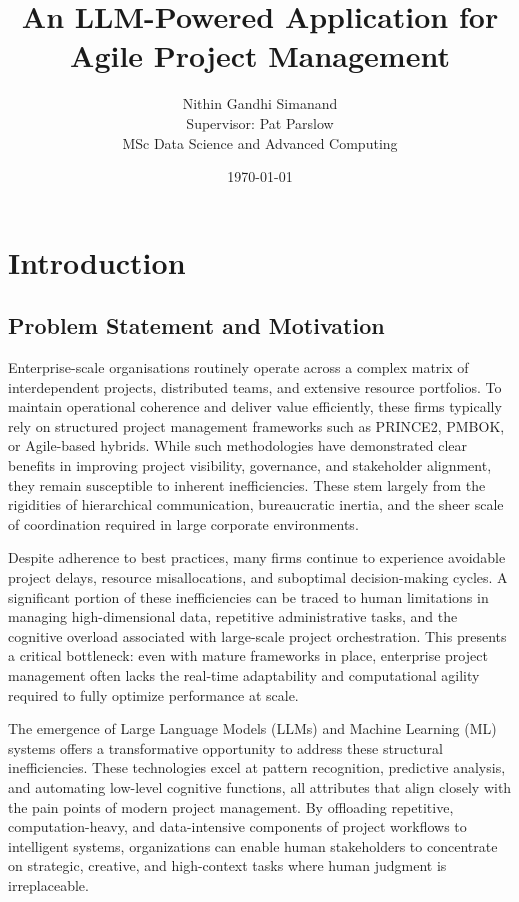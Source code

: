 \documentclass[12pt,a4paper]{report}
\title{\textbf{An LLM-Powered Application for Agile Project Management}}
\author{Nithin Gandhi Simanand \\ Supervisor: Pat Parslow \\ MSc Data Science and Advanced Computing}
\date{\today}
\begin{document}
\maketitle

\tableofcontents
\newpage

\chapter{Introduction}  %
\section{Problem Statement and Motivation}
Enterprise-scale organisations routinely operate across a complex matrix of interdependent projects, distributed teams, and extensive resource portfolios. To maintain operational coherence and deliver value efficiently, these firms typically rely on structured project management frameworks such as PRINCE2, PMBOK, or Agile-based hybrids. While such methodologies have demonstrated clear benefits in improving project visibility, governance, and stakeholder alignment, they remain susceptible to inherent inefficiencies. These stem largely from the rigidities of hierarchical communication, bureaucratic inertia, and the sheer scale of coordination required in large corporate environments.

Despite adherence to best practices, many firms continue to experience avoidable project delays, resource misallocations, and suboptimal decision-making cycles. A significant portion of these inefficiencies can be traced to human limitations in managing high-dimensional data, repetitive administrative tasks, and the cognitive overload associated with large-scale project orchestration. This presents a critical bottleneck: even with mature frameworks in place, enterprise project management often lacks the real-time adaptability and computational agility required to fully optimize performance at scale.

The emergence of Large Language Models (LLMs) and Machine Learning (ML) systems offers a transformative opportunity to address these structural inefficiencies. These technologies excel at pattern recognition, predictive analysis, and automating low-level cognitive functions, all attributes that align closely with the pain points of modern project management. By offloading repetitive, computation-heavy, and data-intensive components of project workflows to intelligent systems, organizations can enable human stakeholders to concentrate on strategic, creative, and high-context tasks where human judgment is irreplaceable.
\end{document}
